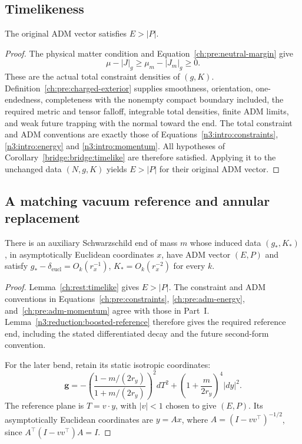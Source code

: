 \subsection{Timelikeness}

\begin{lemma}
\label{ch:rest:timelike}
The original ADM vector satisfies $E>|P|$.
\end{lemma}
\begin{proof}
The physical matter condition and Equation~\eqref{ch:pre:neutral-margin}
give
\[
 \mu-|J|_g\ge\mu_m-|J_m|_g\ge0.
\]
These are the actual total constraint densities of $(g,K)$.
Definition~\ref{ch:pre:charged-exterior} supplies smoothness, orientation,
one-endedness, completeness with the nonempty compact boundary included,
the required metric and tensor falloff, integrable total densities,
finite ADM limits, and weak future trapping with the normal toward the
end. The total constraint and ADM conventions are exactly those of
Equations~\eqref{n3:intro:constraints}, \eqref{n3:intro:energy} and
\eqref{n3:intro:momentum}. All hypotheses of
Corollary~\ref{bridge:bridge:timelike} are therefore satisfied.
Applying it to the unchanged data $(N,g,K)$ yields $E>|P|$
for their original ADM vector.
\end{proof}

\subsection{A matching vacuum reference and annular replacement}

\begin{lemma}
\label{ch:rest:reference}
There is an auxiliary Schwarzschild end of mass $m$ whose induced data
$(g_*,K_*)$, in asymptotically Euclidean coordinates $x$, have ADM vector
$(E,P)$ and satisfy
$g_*-\delta_{\mathrm{eucl}}=O_k(r_x^{-1})$,
$K_*=O_k(r_x^{-2})$ for every $k$.
\end{lemma}
\begin{proof}
Lemma~\ref{ch:rest:timelike} gives $E>|P|$. The constraint and ADM
conventions in Equations~\eqref{ch:pre:constraints},
\eqref{ch:pre:adm-energy}, and~\eqref{ch:pre:adm-momentum} agree with
those in Part~I. Lemma~\ref{n3:reduction:boosted-reference} therefore
gives the required reference end, including the stated differentiated
decay and the future second-form convention.

For the later bend, retain its static isotropic coordinates:
\begin{equation}
 \label{ch:rest:schwarzschild}
 \mathbf g=-\left(\frac{1-m/(2r_y)}{1+m/(2r_y)}\right)^2dT^2
       +\left(1+\frac m{2r_y}\right)^4|dy|^2.
\end{equation}
The reference plane is $T=v\cdot y$, with $|v|<1$ chosen to give
$(E,P)$. Its asymptotically Euclidean coordinates are $y=Ax$, where
$A=(I-vv^\top)^{-1/2}$, since $A^\top(I-vv^\top)A=I$.
\end{proof}


